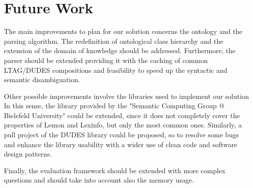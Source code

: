 \section{Future Work}
\label{sec:improvements}

The main improvements to plan for our solution concerns the ontology and the parsing algorithm.
%
The redefinition of ontological class hierarchy and the extension of the domain of knowledge should be addressed.
%
Furthermore, the parser should be extended providing it with the caching of common LTAG/DUDES compositions and feasibility to speed up the syntactic and semantic disambiguation.

Other possible improvements involve the libraries used to implement our solution
%
In this sense, the library provided by the "Semantic Computing Group @ Bielefeld University" could be extended, since it does not completely cover the properties of Lemon and Lexinfo, but only the most common ones.
%
Similarly, a pull project of the DUDES library could be proposed, so to resolve some bugs and enhance the library usability with a wider use of clean code and software design patterns.

Finally, the evaluation framework should be extended with more complex questions and should take into account also the memory usage.